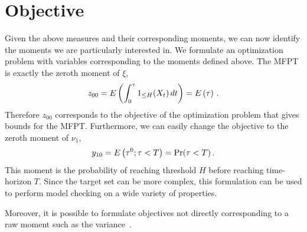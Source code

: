 \section{Objective}
Given the above measures and their corresponding moments, we can
now identify the moments we are particularly interested in.
We formulate an optimization problem with variables corresponding
to the moments defined above.
The \ac{MFPT} is exactly the zeroth moment of $\xi$,
\[
  z_{00}={E}\left(\int_0^{\tau}1_{\leq H}(X_t)\,dt\right) = {E}\left(\tau\right)\,.
\]
Therefore $z_{00}$ corresponds to the objective of the optimization problem
that gives bounds for the \ac{MFPT}.
Furthermore, we can easily change the objective to the
zeroth moment of $\nu_1$,
\[
  y_{10} = {E}\left(\tau^0;\tau<T\right)=\Pr(\tau < T)\,.
\]
This moment is the probability of reaching
threshold $H$ before reaching time-horizon $T$. Since the target set
can be more complex, this formulation can be used to perform model checking on a
wide variety of properties.

Moreover, it is possible to formulate objectives not directly corresponding to
a raw moment such as the
variance~\parencite{sakurai2019bounding,dowdy2018bounds}.

